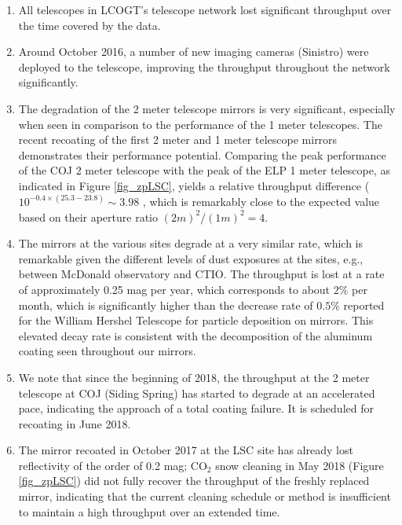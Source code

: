 \documentclass[]{spieman}
\begin{document}
\begin{enumerate}
\item All telescopes in LCOGT's telescope network lost significant throughput over the time covered
 by the data. 

\item Around October 2016, a number of new imaging cameras (Sinistro) were deployed to the 
telescope, improving the throughput throughout the network significantly.

\item The degradation of the 2 meter telescope mirrors is very significant, especially when seen in
comparison to the performance of the 1 meter telescopes. The recent recoating of the first 2 meter
and 1 meter telescope mirrors demonstrates their  performance potential. Comparing the peak 
performance of the COJ 2 meter telescope with the peak of the ELP 1 meter telescope, as indicated 
in Figure \ref{fig_zpLSC}, yields a  relative throughput difference  ($10^{-0.4\times (25.3-23.8)} 
\sim 3.98$ , which is remarkably close to the expected value based on their aperture ratio 
$(2m)^2/(1m)^2 = 4$.

\item The mirrors at the various sites degrade at a very similar rate, which is remarkable given the
different levels of dust exposures at the sites, e.g., between McDonald observatory and CTIO. The
throughput is lost at a rate of approximately 0.25 mag per year, which corresponds to about $2 \%$
per month, which is significantly higher than the decrease rate of $0.5\%$ reported for the William
Hershel Telescope\cite{designolt,benn2000} for particle deposition on mirrors. This elevated decay
rate is  consistent with the decomposition of the aluminum coating seen throughout our mirrors.

\item We note that since the beginning of 2018, the throughput at the 2 meter telescope at COJ 
(Siding Spring) has started to degrade at an accelerated pace, indicating the approach of a total 
coating failure. It is scheduled for recoating in June 2018.

\item The  mirror recoated in October 2017 at the LSC site has already lost reflectivity of the
 order of 0.2 mag; CO$_2$ snow cleaning in May 2018 (Figure \ref{fig_zpLSC}) did not fully recover
 the throughput of the freshly replaced mirror,  indicating that the current cleaning schedule or
 method is insufficient to maintain a high throughput over an extended time.

\end{enumerate}
\end{document}
